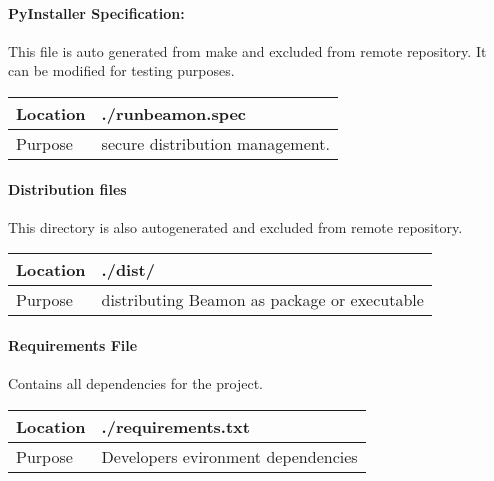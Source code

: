 \documentclass[letterpaper,10pt,english]{sphinxmanual}
\begin{document}
\paragraph{PyInstaller Specification:}
\label{\detokenize{structure:pyinstaller-specification}}
This file is auto generated from make and excluded from remote repository. It can be modified for testing purposes.


\begin{savenotes}\sphinxattablestart
\centering
\begin{tabulary}{\linewidth}[t]{|T|T|}
\hline

Location
&
./runbeamon.spec
\\
\hline
Purpose
&
secure distribution management.
\\
\hline
\end{tabulary}
\par
\sphinxattableend\end{savenotes}


\paragraph{Distribution files}
\label{\detokenize{structure:distribution-files}}
This directory is also autogenerated and excluded from remote repository.


\begin{savenotes}\sphinxattablestart
\centering
\begin{tabulary}{\linewidth}[t]{|T|T|}
\hline

Location
&
./dist/
\\
\hline
Purpose
&
distributing Beamon as package or executable
\\
\hline
\end{tabulary}
\par
\sphinxattableend\end{savenotes}


\paragraph{Requirements File}
\label{\detokenize{structure:requirements-file}}
Contains all dependencies for the project.


\begin{savenotes}\sphinxattablestart
\centering
\begin{tabulary}{\linewidth}[t]{|T|T|}
\hline

Location
&
./requirements.txt
\\
\hline
Purpose
&
Developers evironment dependencies
\\
\hline
\end{tabulary}
\par
\sphinxattableend\end{savenotes}
\end{document}
